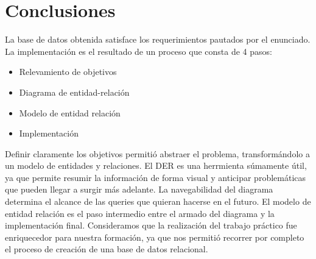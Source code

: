 \section{Conclusiones}

La base de datos obtenida satisface los requerimientos pautados por el enunciado. La implementación
es el resultado de un proceso que consta de 4 pasos:
\begin{itemize}
\item{Relevamiento de objetivos}
\item{Diagrama de entidad-relación}
\item{Modelo de entidad relación}
\item{Implementación}
\end{itemize}
Definir claramente los objetivos permitió abstraer el problema, transformándolo a un modelo de entidades y relaciones.
El DER es una herrmienta súmamente útil, ya que permite resumir la información de forma
visual y anticipar problemáticas que pueden llegar a surgir más adelante. La navegabilidad del diagrama determina
el alcance de las queries que quieran hacerse en el futuro.
El modelo de entidad relación es el paso intermedio entre el armado del diagrama y la implementación final.
Consideramos que la realización del trabajo práctico fue enriquecedor para nuestra formación, ya que nos permitió recorrer
por completo el proceso de creación de una base de datos relacional.
